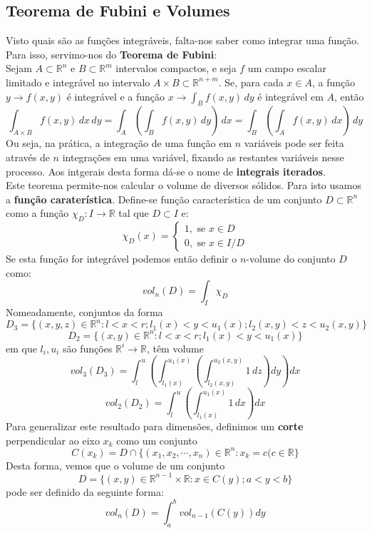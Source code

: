 \documentclass{article}
\begin{document}
\subsection{Teorema de Fubini e Volumes}
Visto quais são as funções integráveis, falta-nos saber como integrar uma função. Para isso, servimo-nos do \textbf{Teorema de Fubini}:\\
Sejam $A \subset \mathbb{R}^n$ e $B \subset \mathbb{R}^m$ intervalos compactos, e seja $f$ um campo escalar limitado e integrável no intervalo $A \times B \subset \mathbb{R}^{n+m}$. Se, para cada $x \in A$, a função $y \to f(x,y)$ é integrável e a função $x \to \int_B f(x,y) \, dy$ é integrável em $A$, então
$$
\int_{A \times B} f(x,y) \, dx \, dy = \int_A \left( \int_B f(x,y) \, dy \right) \, dx = \int_B \left( \int_A f(x,y) \, dx \right) \, dy
$$
Ou seja, na prática, a integração de uma função em $n$ variáveis pode ser feita através de $n$ integrações em uma variável, fixando as restantes variáveis nesse processo. Aos intgerais desta forma dá-se o nome de \textbf{integrais iterados}.\\
Este teorema permite-nos calcular o volume de diversos sólidos. Para isto usamos a \textbf{função caraterística}. Define-se função característica de um conjunto $D \subset \mathbb{R}^n$ como a função $\chi_D: I \to \mathbb{R}$ tal que $D \subset I$ e:
$$
\chi _D(x) = 
\begin{cases}
1, \text{ se } x \in D \\
0, \text{ se } x \in I/D
\end{cases}
$$
Se esta função for integrável podemos então definir o $n$-volume do conjunto $D$ como:
$$
vol_n(D) = \int_I \chi _D
$$
Nomeadamente, conjuntos da forma
$$
D_3 = \{ (x,y,z) \in \mathbb{R}^n: l<x<r; l_1(x) < y < u_1(x); l_2(x, y) < z < u_2(x,y) \}
$$
$$
D_2 = \{ (x,y) \in \mathbb{R}^n: l<x<r; l_1(x) < y < u_1(x) \}
$$
em que $l_i, u_i$ são funções $\mathbb{R}^i \to \mathbb{R}$, têm volume
$$
vol_3(D_3) = \int_l^u \left( \int_{l_1(x)}^{u_1(x)} \left( \int_{l_2(x,y)}^{u_2(x,y)} 1 \, dz \right) dy \right) dx
$$
$$
vol_2(D_2) = \int_l^u \left( \int_{l_1(x)}^{u_1(x)} 1 \, dx \right) dx
$$
Para generalizar este resultado para dimensões, definimos um \textbf{corte} perpendicular ao eixo $x_k$ como um conjunto
$$
C(x_k) = D \cap \{ (x_1, x_2, \cdots, x_n) \in \mathbb{R}^n : x_k = c (c \in \mathbb{R} \}
$$
Desta forma, vemos que o volume de um conjunto 
$$
D = \{ (x,y) \in \mathbb{R}^{n-1} \times \mathbb{R}: x \in C(y) ; a < y < b \}
$$ 
pode ser definido da seguinte forma:
$$
vol_n(D) = \int_a^b vol_{n-1}(C(y)) dy
$$
\end{document}
